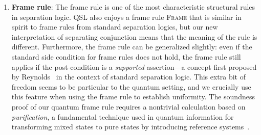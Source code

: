 \documentclass[conference,compsoc, 10pt]{IEEEtran}
\newcommand{\jh}[1]{\textit{\color{red}[JH] : #1}}
\newcommand{\lz}[1]{\textit{\color{blue}[LZ] : #1}}
\newcommand {\Lfree }[1] {{\mathsf{free}{\left(#1\right)}}}
\newcommand {\free }[1] {{\mathsf{free}\left(#1\right)}}
\newcommand {\var } {\mathsf{var}}
\newcommand {\prog } {{\mathbf{C}}}
\begin{document}
\begin{enumerate}
    \item 
      \textbf{Frame rule}: The frame rule is one of the most characteristic
      structural rules in separation logic. QSL also enjoys a frame rule
      \textsc{Frame} that is similar in spirit to frame rules from standard
      separation logics, but our new interpretation of separating conjunction
      means that the meaning of the rule is different. Furthermore, the frame
      rule can be generalized slightly: even if the standard side condition for
      frame rules does not hold, the frame rule still applies if the
      post-condition is a \emph{supported} assertion---a concept first proposed
      by Reynolds~\cite{Rey08} in the context of standard separation logic. This
      extra bit of freedom seems to be particular to the quantum setting, and we
      crucially use this feature when using the frame rule to establish
      uniformity.
      The soundness proof of our quantum frame rule requires a nontrivial
      calculation based on \emph{purification}, a fundamental technique used in
      quantum information for transforming mixed states to pure states by
      introducing reference systems~\cite{NC00}.
		

\end{enumerate}
\end{document}
